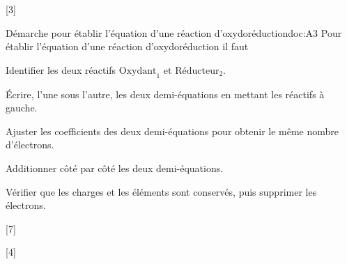 [3]


\begin{doc}{Démarche pour établir l'équation d'une réaction d'oxydoréduction}{doc:A3}
  Pour établir l'équation d'une réaction d'oxydoréduction il faut
  \begin{listePoints}
    \item Identifier les deux réactifs $\text{Oxydant}_1$ et $\text{Réducteur}_2$.
    \item Écrire, l'une sous l'autre, les deux demi-équations en mettant les réactifs à gauche.
    \item Ajuster les coefficients des deux demi-équations pour obtenir le même nombre d'électrons.
    \item Additionner côté par côté les deux demi-équations.
    \item Vérifier que les charges et les éléments sont conservés, puis supprimer les électrons.
  \end{listePoints}
\end{doc}

[7]

[4]